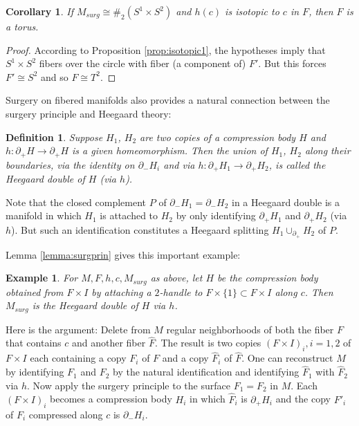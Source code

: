 \documentclass{amsart}
\newtheorem{cor}[thm]{Corollary}
\newtheorem{defin}[thm]{Definition}
\newtheorem{example}[thm]{Example}
\newcommand{\bdd}{\mbox{$\partial$}}
\begin{document}
\begin{cor}  \label{cor:isotopic2} If $M_{surg} \cong \#_{2} (S^{1} \times S^{2})$ and $h(c)$ is isotopic to $c$ in $F$, then $F$ is a torus.
\end{cor}

\begin{proof}   According to Proposition \ref{prop:isotopic1}, the hypotheses imply that $S^1 \times S^2$ fibers over the circle with fiber (a component of) $F'$.  But this forces $F' \cong S^2$ and so $F \cong T^2$. \end{proof}

Surgery on fibered manifolds also provides a natural connection between the surgery principle and Heegaard theory:

\begin{defin}  Suppose $H_1$, $H_2$ are two copies of a compression body $H$ and $h: \bdd_+ H  \to \bdd_+ H$ is a given homeomorphism.  Then the union of $H_1$, $H_2$ along their boundaries, via the identity on $\bdd_- H_i$ and via $h:  \bdd_+ H_1  \to \bdd_+ H_2$, is called the {\em Heegaard double} of $H$ (via $h$).
\end{defin}

Note that the closed complement $P$ of $\bdd_- H_1 = \bdd_- H_2$ in a Heegaard double is a manifold in which $H_1$ is attached to $H_2$ by only identifying $\bdd_+ H_1$ and $\bdd_+H_2$ (via $h$).  But such an identification constitutes a Heegaard splitting $ H_1 \cup_{\bdd_+} H_2$ of $P$.

Lemma \ref{lemma:surgprin} gives this important example:

\begin{example}  \label{example:double}  For $M, F, h, c, M_{surg}$ as above, let $H$ be the compression body obtained from $F \times I$ by attaching a $2$-handle to $F \times \{ 1 \} \subset F \times I$ along $c$.  Then $M_{surg}$ is the Heegaard double of $H$ via $h$.
\end{example}

Here is the argument:  Delete from $M$ regular neighborhoods of both the fiber $F$ that contains $c$ and another fiber $\hat{F}$.  The result is two copies $(F \times I)_i, i = 1, 2$ of $F \times I$ each containing a copy $F_i$ of $F$ and a copy $\hat{F}_i$ of $\hat{F}$.  One can reconstruct $M$ by identifying $F_1$ and $F_2$ by the natural identification and identifying $\hat{F}_1$ with $\hat{F}_2$ via $h$.  Now apply the surgery principle to the surface $F_1 = F_2$ in $M$.  Each $(F \times I)_i$ becomes a compression body $H_i$ in which $\hat{F}_i$ is $\bdd_+ H_i$ and the copy $F'_i$ of $F_i$ compressed along $c$ is $\bdd_- H_i$.
\end{document}

